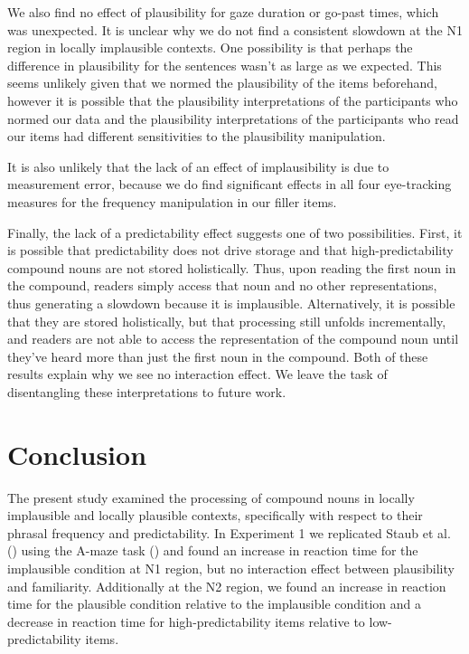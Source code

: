 \documentclass[
  12pt,
  letterpaper,
]{scrreport}
\begin{document}
We also find no effect of plausibility for gaze duration or go-past
times, which was unexpected. It is unclear why we do not find a
consistent slowdown at the N1 region in locally implausible contexts.
One possibility is that perhaps the difference in plausibility for the
sentences wasn't as large as we expected. This seems unlikely given that
we normed the plausibility of the items beforehand, however it is
possible that the plausibility interpretations of the participants who
normed our data and the plausibility interpretations of the participants
who read our items had different sensitivities to the plausibility
manipulation.

It is also unlikely that the lack of an effect of implausibility is due
to measurement error, because we do find significant effects in all four
eye-tracking measures for the frequency manipulation in our filler
items.

Finally, the lack of a predictability effect suggests one of two
possibilities. First, it is possible that predictability does not drive
storage and that high-predictability compound nouns are not stored
holistically. Thus, upon reading the first noun in the compound, readers
simply access that noun and no other representations, thus generating a
slowdown because it is implausible. Alternatively, it is possible that
they are stored holistically, but that processing still unfolds
incrementally, and readers are not able to access the representation of
the compound noun until they've heard more than just the first noun in
the compound. Both of these results explain why we see no interaction
effect. We leave the task of disentangling these interpretations to
future work.

\section{Conclusion}\label{conclusion}

The present study examined the processing of compound nouns in locally
implausible and locally plausible contexts, specifically with respect to
their phrasal frequency and predictability. In Experiment 1 we
replicated Staub et al.
() using the A-maze
task () and
found an increase in reaction time for the implausible condition at N1
region, but no interaction effect between plausibility and familiarity.
Additionally at the N2 region, we found an increase in reaction time for
the plausible condition relative to the implausible condition and a
decrease in reaction time for high-predictability items relative to
low-predictability items.
\end{document}
